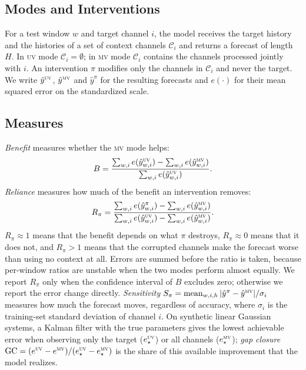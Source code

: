 \documentclass[runningheads]{llncs}
\newcommand{\MV}{\textsc{mv}}
\newcommand{\UV}{\textsc{uv}}
\newcommand{\Ben}{B}
\newcommand{\Rel}{R}
\newcommand{\Sen}{S}
\newcommand{\GC}{\mathrm{GC}}
\begin{document}
\subsection{Modes and Interventions}
For a test window $w$ and target channel $i$, the model receives the target
history and the histories of a set of context channels $\mathcal{C}_i$ and
returns a forecast of length $H$. In \UV{} mode $\mathcal{C}_i=\emptyset$;
in \MV{} mode $\mathcal{C}_i$ contains the channels processed jointly with
$i$. An intervention $\pi$ modifies only the channels in $\mathcal{C}_i$ and
never the target. We write $\hat y^{\UV}$, $\hat y^{\MV}$ and $\hat y^{\pi}$
for the resulting forecasts and $e(\cdot)$ for their mean squared error on the
standardized scale.

\subsection{Measures}
\emph{Benefit} measures whether the \MV{} mode helps:
\begin{equation}
  \Ben = \frac{\sum_{w,i} e(\hat y^{\UV}_{w,i}) - \sum_{w,i} e(\hat y^{\MV}_{w,i})}
              {\sum_{w,i} e(\hat y^{\UV}_{w,i})}.
\end{equation}
\emph{Reliance} measures how much of the benefit an intervention removes:
\begin{equation}
  \Rel_\pi = \frac{\sum_{w,i} e(\hat y^{\pi}_{w,i}) - \sum_{w,i} e(\hat y^{\MV}_{w,i})}
                  {\sum_{w,i} e(\hat y^{\UV}_{w,i}) - \sum_{w,i} e(\hat y^{\MV}_{w,i})}.
\end{equation}
$\Rel_\pi\approx 1$ means that the benefit depends on what $\pi$ destroys,
$\Rel_\pi\approx 0$ means that it does not, and $\Rel_\pi>1$ means that the
corrupted channels make the forecast worse than using no context at all.
Errors are summed before the ratio is taken, because per-window ratios are
unstable when the two modes perform almost equally. We report $\Rel_\pi$
only when the confidence interval of $\Ben$ excludes zero; otherwise we
report the error change directly. \emph{Sensitivity}
$\Sen_\pi=\operatorname{mean}_{w,i,h}|\hat y^{\pi}-\hat y^{\MV}|/\sigma_i$
measures how much the forecast moves, regardless of accuracy, where
$\sigma_i$ is the training-set standard deviation of channel $i$.
On synthetic linear Gaussian systems, a Kalman filter with the true parameters
gives the lowest achievable error when observing only the target
($e^{\UV}_\star$) or all channels ($e^{\MV}_\star$); \emph{gap closure}
$\GC=(e^{\UV}-e^{\MV})/(e^{\UV}_\star-e^{\MV}_\star)$ is the share of this
available improvement that the model realizes.
\end{document}
